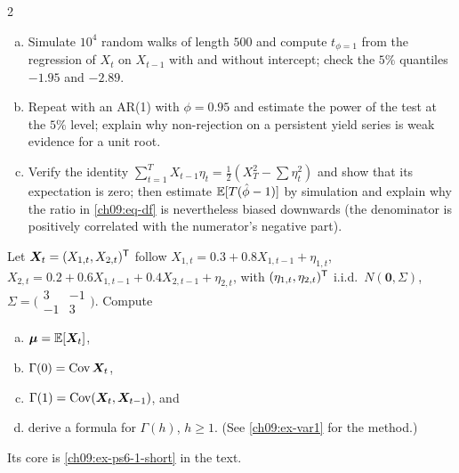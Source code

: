 \begin{paracol}{2}
\begin{exercise}\label{ch09:ex-x-df}
\leavevmode
\begin{enumerate}[(a)]
  \item Simulate $10^4$ random walks of length $500$ and compute $t_{\phi=1}$ from the regression of $X_t$ on $X_{t-1}$ with and without intercept; check the $5\%$ quantiles $-1.95$ and $-2.89$.
  \item Repeat with an AR(1) with $\phi=0.95$ and estimate the power of the test at the $5\%$ level; explain why
      non-rejection on a persistent yield series is weak evidence for a unit root.
  \item Verify the identity $\sum_{t=1}^TX_{t-1}\eta_t=\frac12(X_T^2-\sum\eta_t^2)$ and show that its expectation is zero; then estimate $\mathbb{E}[T(\hat\phi-1)]$ by simulation and explain why the ratio in \eqref{ch09:eq-df} is nevertheless biased downwards (the denominator is positively correlated with the numerator's negative part).
\end{enumerate}
\end{exercise}

\begin{exercise}\label{ch09:ex-ps6-1}
Let $\bm X_t=(X_{1,t},X_{2,t})^{\mathsf T}$ follow $X_{1,t}=0.3+0.8X_{1,t-1}+\eta_{1,t}$, $X_{2,t}=0.2+0.6X_{1,t-1}+0.4X_{2,t-1}+\eta_{2,t}$, with $(\eta_{1,t},\eta_{2,t})^{\mathsf T}$ i.i.d.\ $N(\bm0,\Sigma)$, $\Sigma=\bigl(\begin{smallmatrix}3&-1\\-1&3\end{smallmatrix}\bigr)$.
Compute
\begin{enumerate}[(a)]
  \item $\bm\mu=\mathbb{E}[\bm X_t]$,
  \item $\Gamma(0)=\operatorname{Cov}\bm X_t$,
  \item $\Gamma(1)=\operatorname{Cov}(\bm X_t,\bm X_{t-1})$, and
  \item derive a formula for $\Gamma(h)$, $h\ge1$. (See \cref{ch09:ex-var1} for the method.)
\end{enumerate}
Its core is \cref{ch09:ex-ps6-1-short} in the text.
\end{exercise}


\end{paracol}
